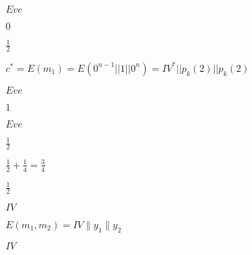 \documentclass[10pt]{book}
\begin{document}
\begin{mdSnippets}
\begin{mdInlineSnippet}%
$Eve$\end{mdInlineSnippet}%
\begin{mdInlineSnippet}%
$0$\end{mdInlineSnippet}%
\begin{mdInlineSnippet}[93b05c90d14a117ba52da1d743a43ab1]%
$\frac{1}{2}$\end{mdInlineSnippet}%
\begin{mdInlineSnippet}%
$c^* = E(m_1) = E(0^{n-1}|| 1|| 0^{n}) = IV^* || p_k(2) || p_k(2)$\end{mdInlineSnippet}%
\begin{mdInlineSnippet}%
$Eve$\end{mdInlineSnippet}%
\begin{mdInlineSnippet}[c4ca4238a0b923820dcc509a6f75849b]%
$1$\end{mdInlineSnippet}%
\begin{mdInlineSnippet}%
$Eve$\end{mdInlineSnippet}%
\begin{mdInlineSnippet}[93b05c90d14a117ba52da1d743a43ab1]%
$\frac{1}{2}$\end{mdInlineSnippet}%
\begin{mdInlineSnippet}[c08b2264c62d116f15878570b85a81e5]%
$\frac{1}{2} + \frac{1}{4} = \frac{3}{4}$\end{mdInlineSnippet}%
\begin{mdInlineSnippet}[93b05c90d14a117ba52da1d743a43ab1]%
$\frac{1}{2}$\end{mdInlineSnippet}%
\begin{mdInlineSnippet}[cf482c5807b62034beeabdb795c5a689]%
$IV$\end{mdInlineSnippet}%
\begin{mdInlineSnippet}[22f8e69d5933b9a00fb8d318e7b502ed]%
$E(m_1,m_2)=IV\|y_1\|y_2$\end{mdInlineSnippet}%
\begin{mdInlineSnippet}[cf482c5807b62034beeabdb795c5a689]%
$IV$\end{mdInlineSnippet}%

\end{mdSnippets}
\end{document}
